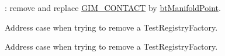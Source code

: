 \begin{DoxyRefList}
\item[\label{todo__todo000035}%
\hypertarget{todo__todo000035}{}%
Class \hyperlink{class_g_i_m___c_o_n_t_a_c_t}{G\+I\+M\+\_\+\+C\+O\+N\+T\+A\+C\+T} ]\+: remove and replace \hyperlink{class_g_i_m___c_o_n_t_a_c_t}{G\+I\+M\+\_\+\+C\+O\+N\+T\+A\+C\+T} by \hyperlink{classbt_manifold_point}{bt\+Manifold\+Point}.  
\item[\label{todo__todo000014}%
\hypertarget{todo__todo000014}{}%
Member \hyperlink{class_test_factory_registry_afa3fb925b07eb34e9ccfab84812afc18}{Test\+Factory\+Registry\+:\+:unregister\+Factory} (\hyperlink{class_test_factory}{Test\+Factory} $\ast$factory)]Address case when trying to remove a Test\+Registry\+Factory. 

Address case when trying to remove a Test\+Registry\+Factory. 
\end{DoxyRefList}